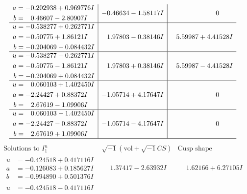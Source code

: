 \documentclass[1p]{elsarticle_modified}
\theoremstyle{definition}
\newcommand{\I}{\sqrt{-1}}
\begin{document}
$$\begin{array}{c|c|c}
\begin{aligned}
a &= -0.202938 + 0.969776 I \\
b &= \phantom{-}0.46607 - 2.80907 I\end{aligned}
 & -0.46634 - 1.58117 I & \phantom{-0.000000 } 0 \\ \hline\begin{aligned}
u &= -0.538277 + 0.262771 I \\
a &= -0.50775 + 1.86121 I \\
b &= -0.204069 - 0.084432 I\end{aligned}
 & \phantom{-}1.97803 - 0.38146 I & \phantom{-}5.59987 + 4.41528 I \\ \hline\begin{aligned}
u &= -0.538277 - 0.262771 I \\
a &= -0.50775 - 1.86121 I \\
b &= -0.204069 + 0.084432 I\end{aligned}
 & \phantom{-}1.97803 + 0.38146 I & \phantom{-}5.59987 - 4.41528 I \\ \hline\begin{aligned}
u &= \phantom{-}0.060103 + 1.402450 I \\
a &= -2.24427 + 0.88372 I \\
b &= \phantom{-}2.67619 - 1.09906 I\end{aligned}
 & -1.05714 + 4.17647 I & \phantom{-0.000000 } 0 \\ \hline\begin{aligned}
u &= \phantom{-}0.060103 - 1.402450 I \\
a &= -2.24427 - 0.88372 I \\
b &= \phantom{-}2.67619 + 1.09906 I\end{aligned}
 & -1.05714 - 4.17647 I & \phantom{-0.000000 } 0\\
 \hline 
 \end{array}$$\newpage$$\begin{array}{c|c|c}  
\text{Solutions to }I^u_{1}& \I (\text{vol} + \sqrt{-1}CS) & \text{Cusp shape}\\
 \hline 
\begin{aligned}
u &= -0.424518 + 0.417116 I \\
a &= -0.126083 + 0.185627 I \\
b &= -0.994890 + 0.501376 I\end{aligned}
 & \phantom{-}1.37417 - 2.63932 I & \phantom{-}1.62166 + 6.27105 I \\ \hline\begin{aligned}
u &= -0.424518 - 0.417116 I \\

\end{aligned}
\end{array}$$
\end{document}
